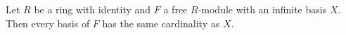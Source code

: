 Let $R$ be a ring with identity and $F$ a free $R$-module with an infinite basis $X$. Then every basis of $F$ has the same cardinality as $X$.
